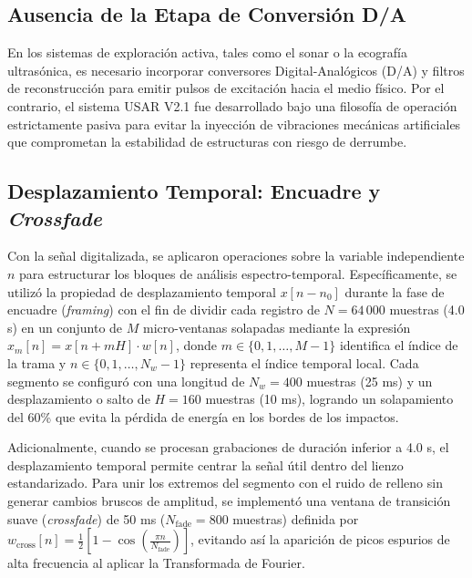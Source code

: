 \documentclass[journal, a4paper]{IEEEtran}
\begin{document}
\subsection{Ausencia de la Etapa de Conversión D/A}
En los sistemas de exploración activa, tales como el sonar o la ecografía ultrasónica, es necesario incorporar conversores Digital-Analógicos (D/A) y filtros de reconstrucción para emitir pulsos de excitación hacia el medio físico. Por el contrario, el sistema USAR V2.1 fue desarrollado bajo una filosofía de operación estrictamente pasiva para evitar la inyección de vibraciones mecánicas artificiales que comprometan la estabilidad de estructuras con riesgo de derrumbe.



\subsection{Desplazamiento Temporal: Encuadre y \textit{Crossfade}}
Con la señal digitalizada, se aplicaron operaciones sobre la variable independiente $n$ para estructurar los bloques de análisis espectro-temporal. Específicamente, se utilizó la propiedad de desplazamiento temporal $x[n - n_0]$ durante la fase de encuadre (\textit{framing}) con el fin de dividir cada registro de $N = 64\,000$ muestras (4.0 s) en un conjunto de $M$ micro-ventanas solapadas mediante la expresión $x_m[n] = x[n + m H] \cdot w[n]$, donde $m \in \{0, 1, \dots, M-1\}$ identifica el índice de la trama y $n \in \{0, 1, \dots, N_w-1\}$ representa el índice temporal local. Cada segmento se configuró con una longitud de $N_w = 400$ muestras (25 ms) y un desplazamiento o salto de $H = 160$ muestras (10 ms), logrando un solapamiento del 60\% que evita la pérdida de energía en los bordes de los impactos.

Adicionalmente, cuando se procesan grabaciones de duración inferior a 4.0 s, el desplazamiento temporal permite centrar la señal útil dentro del lienzo estandarizado. Para unir los extremos del segmento con el ruido de relleno sin generar cambios bruscos de amplitud, se implementó una ventana de transición suave (\textit{crossfade}) de 50 ms ($N_{\text{fade}} = 800$ muestras) definida por $w_{\text{cross}}[n] = \frac{1}{2} \left[ 1 - \cos\left(\frac{\pi n}{N_{\text{fade}}}\right) \right]$, evitando así la aparición de picos espurios de alta frecuencia al aplicar la Transformada de Fourier.
\end{document}
